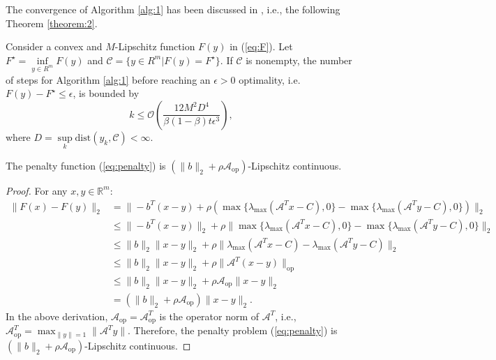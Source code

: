 \documentclass{jcmlatex}
\begin{document}
The convergence of Algorithm \ref{alg:1} has been discussed in \cite{diaz2023optimal,monteiro2024parameter}, i.e., the following Theorem \ref{theorem:2}.
\begin{theorem}\label{theorem:2}
Consider a convex and \(M\)-Lipschitz function \(F(y)\) in
(\ref{eq:F}). Let \(F^{\star}=\underset{y\in R^{m}}{\inf} F(y) \) and \(\mathcal{C} = \{y \in R^{m} | F(y) = F^{\star}\}\). If \(\mathcal{C}\) is nonempty, the number of steps for Algorithm \ref{alg:1} before reaching an \(\epsilon> 0\) optimality, i.e. \(F(y)-F^{\star} \leq \epsilon\), is bounded by
\begin{equation*}
k\leq \mathcal{O}(\frac{12M^{2}D^{4}}{\beta(1-\beta)t\epsilon^{3}}),
\end{equation*}
where \(D = \underset{k}{\sup} \text{dist}(y_{k},\mathcal{C})<\infty\).
\end{theorem}
\begin{lemma}\label{lemma4.2}
The penalty function (\ref{eq:penalty}) is \((\|b\|_{2}+\rho \mathcal{A}_{\text{op}})\)-Lipschitz continuous.
\end{lemma}
\begin{proof}
    For any \(x, y \in \mathbb{R}^m\):
    \begin{equation*}
    \begin{aligned}
         \|F(x)-F(y)\|_{2}&=\|-b^{T}(x-y)+\rho(\max\{\lambda_{\max}(\mathcal{A}^{T}x-C),0\}-\max\{\lambda_{\max}(\mathcal{A}^{T}y-C),0\})\|_{2}\\
         &\leq \|-b^{T}(x-y)\|_{2}+\rho\|\max\{\lambda_{\max}(\mathcal{A}^{T}x-C),0\}-\max\{\lambda_{\max}(\mathcal{A}^{T}y-C),0\}\|_{2}\\
         &\leq \|b\|_{2}\|x-y\|_{2}+\rho\|\lambda_{\max}(\mathcal{A}^{T}x-C)-\lambda_{\max}(\mathcal{A}^{T}y-C)\|_{2}\\
         &\leq \|b\|_{2}\|x-y\|_{2}+\rho\|\mathcal{A}^{T}(x-y)\|_{\text{op}}\\
         &\leq \|b\|_{2}\|x-y\|_{2}+\rho\mathcal{A}_{\text{op}}\|x-y\|_{2}\\
         &=(\|b\|_{2}+\rho \mathcal{A}_{\text{op}})\|x-y\|_{2}.
    \end{aligned}
    \end{equation*}
    In the above derivation, \(\mathcal{A}_{\text{op}}=\mathcal{A}^{T}_{\text{op}}\) is the operator norm of \(\mathcal{A}^{T}\), i.e., \(\mathcal{A}^{T}_{\text{op}} = \max_{\|y\| = 1} \|\mathcal{A}^{T}y\|\). Therefore, the penalty problem (\ref{eq:penalty}) is \((\|b\|_2 + \rho \mathcal{A}_{\text{op}})\)-Lipschitz continuous.
    \hfill\fbox{\rule{0pt}{0.42mm}\rule{0.42mm}{0pt}}
\end{proof}
\end{document}
